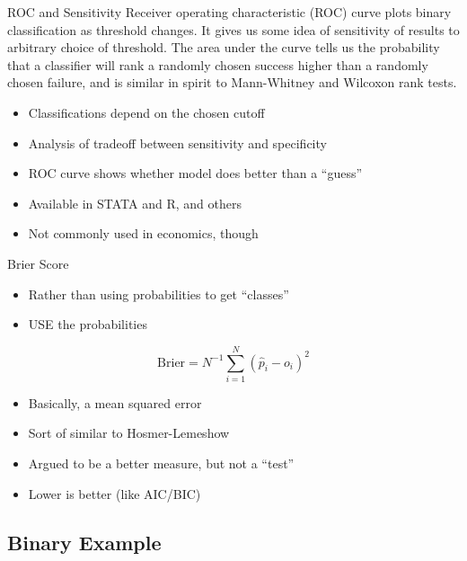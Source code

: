 \documentclass[
  ignorenonframetext,
]{beamer}
\providecommand{\tightlist}{%
  \setlength{\itemsep}{0pt}\setlength{\parskip}{0pt}}
\begin{document}
\begin{frame}{ROC and Sensitivity}
\protect{}\label{roc-and-sensitivity}
Receiver operating characteristic (ROC) curve plots binary
classification as threshold changes. It gives us some idea of
sensitivity of results to arbitrary choice of threshold. The area under
the curve tells us the probability that a classifier will rank a
randomly chosen success higher than a randomly chosen failure, and is
similar in spirit to Mann-Whitney and Wilcoxon rank tests.

\vspace{3mm}

\begin{itemize}
\tightlist
\item
  Classifications depend on the chosen cutoff
\item
  Analysis of tradeoff between sensitivity and specificity
\item
  ROC curve shows whether model does better than a ``guess''
\item
  Available in STATA and R, and others
\item
  Not commonly used in economics, though
\end{itemize}
\end{frame}

\begin{frame}{Brier Score}
\protect{}\label{brier-score}
\begin{itemize}
\tightlist
\item
  Rather than using probabilities to get ``classes''
\item
  USE the probabilities
\end{itemize}

\[
\text{Brier} = N^{-1} \sum_{i=1}^N \left( \hat{p}_i - o_i  \right)^2
\]

\begin{itemize}
\tightlist
\item
  Basically, a mean squared error
\item
  Sort of similar to Hosmer-Lemeshow
\item
  Argued to be a better measure, but not a ``test''
\item
  Lower is better (like AIC/BIC)
\end{itemize}
\end{frame}

\subsection{Binary Example}\label{binary-example}
\end{document}
